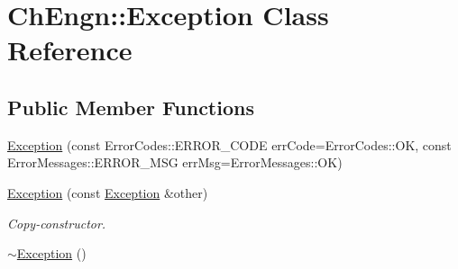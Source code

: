 \hypertarget{classChEngn_1_1Exception}{
\section{ChEngn::Exception Class Reference}
\label{classChEngn_1_1Exception}
}
\subsection*{Public Member Functions}
\begin{DoxyCompactItemize}
\item 
\hyperlink{classChEngn_1_1Exception_a3e97e5234f3f07bd4a5728c789fe5f65}{Exception} (const ErrorCodes::ERROR\_\-CODE errCode=ErrorCodes::OK, const ErrorMessages::ERROR\_\-MSG errMsg=ErrorMessages::OK)
\item 
\hypertarget{classChEngn_1_1Exception_a5f404e2a9925706a99d8796e65d2a1cc}{
\hyperlink{classChEngn_1_1Exception_a5f404e2a9925706a99d8796e65d2a1cc}{Exception} (const \hyperlink{classChEngn_1_1Exception}{Exception} \&other)}
\label{classChEngn_1_1Exception_a5f404e2a9925706a99d8796e65d2a1cc}

\begin{DoxyCompactList}\small\item\em Copy-\/constructor. \item\end{DoxyCompactList}\item 
\hypertarget{classChEngn_1_1Exception_a6fc50135102ba663b36673ad855c483f}{
\hyperlink{classChEngn_1_1Exception_a6fc50135102ba663b36673ad855c483f}{$\sim$Exception} ()}
\label{classChEngn_1_1Exception_a6fc50135102ba663b36673ad855c483f}


\end{DoxyCompactItemize}
